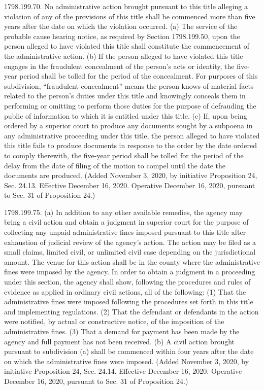 1798.199.70.  No administrative action brought pursuant to this title alleging a violation of any of the provisions of this title shall be commenced more than five years after the date on which the violation occurred.
(a) The service of the probable cause hearing notice, as required by Section 1798.199.50, upon the person alleged to have violated this title shall constitute the commencement of the administrative action.
(b) If the person alleged to have violated this title engages in the fraudulent concealment of the person’s acts or identity, the five-year period shall be tolled for the period of the concealment. For purposes of this subdivision, “fraudulent concealment” means the person knows of material facts related to the person’s duties under this title and knowingly conceals them in performing or omitting to perform those duties for the purpose of defrauding the public of information to which it is entitled under this title.
(c) If, upon being ordered by a superior court to produce any documents sought by a subpoena in any administrative proceeding under this title, the person alleged to have violated this title fails to produce documents in response to the order by the date ordered to comply therewith, the five-year period shall be tolled for the period of the delay from the date of filing of the motion to compel until the date the documents are produced.
(Added November 3, 2020, by initiative Proposition 24, Sec. 24.13. Effective December 16, 2020. Operative December 16, 2020, pursuant to Sec. 31 of Proposition 24.)

1798.199.75.  (a) In addition to any other available remedies, the agency may bring a civil action and obtain a judgment in superior court for the purpose of collecting any unpaid administrative fines imposed pursuant to this title after exhaustion of judicial review of the agency’s action. The action may be filed as a small claims, limited civil, or unlimited civil case depending on the jurisdictional amount. The venue for this action shall be in the county where the administrative fines were imposed by the agency. In order to obtain a judgment in a proceeding under this section, the agency shall show, following the procedures and rules of evidence as applied in ordinary civil actions, all of the following:
(1) That the administrative fines were imposed following the procedures set forth in this title and implementing regulations.
(2) That the defendant or defendants in the action were notified, by actual or constructive notice, of the imposition of the administrative fines.
(3) That a demand for payment has been made by the agency and full payment has not been received.
(b) A civil action brought pursuant to subdivision (a) shall be commenced within four years after the date on which the administrative fines were imposed.
(Added November 3, 2020, by initiative Proposition 24, Sec. 24.14. Effective December 16, 2020. Operative December 16, 2020, pursuant to Sec. 31 of Proposition 24.)

